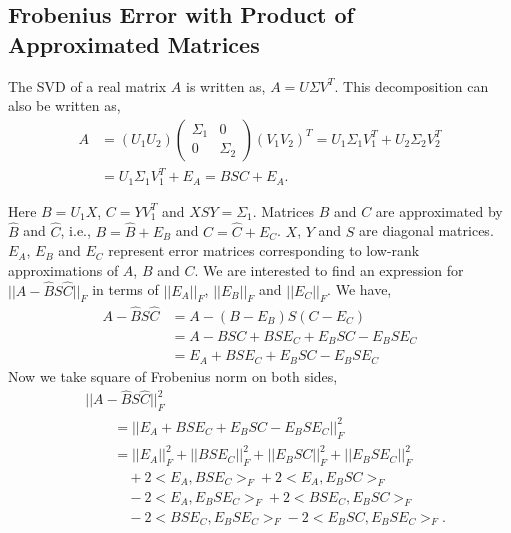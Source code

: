 \documentclass[runningheads]{llncs}
\begin{document}
\subsection{Frobenius Error with Product of Approximated Matrices}
\label{sec:approaches:approxproduct}

The SVD of a real matrix $A$ is written as, $A=U\Sigma V^T$. This decomposition can also be written as,
\begin{align*}
A&=(U_1 U_2)\begin{pmatrix}
\Sigma_1 & 0\\
0 & \Sigma_2
\end{pmatrix}(V_1 V_2)^T = U_1\Sigma_1 V_1^T + U_2 \Sigma_2 V_2^T\\
&= U_1\Sigma_1 V_1^T + E_A = BSC + E_A.
\end{align*}

\noindent Here $B = U_1 X$, $C=YV_1^T$ and $XSY = \Sigma_1$. Matrices $B$ and $C$ are approximated by $\hat{B}$ and $\hat{C}$, i.e., $B = \hat{B} + E_B$ and $C = \hat{C} + E_C$. $X$, $Y$ and $S$ are diagonal matrices. $E_A$, $E_B$ and $E_C$ represent error matrices corresponding to low-rank approximations of $A$, $B$ and $C$. We are interested to find an expression for $||A - \hat{B} S \hat{C}||_F$ in terms of $||E_A||_F$, $||E_B||_F$ and $||E_C||_F$. We have,
\begin{align*}
A - \hat{B} S \hat{C} &= A - (B-E_B)S(C-E_C)\\
&= A - BSC + BSE_C + E_BSC - E_BSE_C\\
&= E_A + BSE_C + E_BSC - E_BSE_C
\end{align*}
Now we take square of Frobenius norm on both sides,
\begin{align*}
&||A - \hat{B} S \hat{C}||_F^2 \\ 
&\qquad= ||E_A + BSE_C + E_BSC - E_BSE_C||_F^2 \\
&\qquad= ||E_A||_F^2 + ||BSE_C||_F^2 + ||E_BSC||_F^2 + ||E_BSE_C||_F^2 \\
&\qquad\quad + 2\boldsymbol{<}E_A, BSE_C\boldsymbol{>}_F + 2<E_A, E_BSC>_F \\
&\qquad\quad -2 <E_A, E_BSE_C>_F + 2 <BSE_C, E_BSC>_F \\
&\qquad\quad -2 <BSE_C, E_BSE_C>_F - 2<E_BSC, E_BSE_C>_F.
\end{align*}
\end{document}
